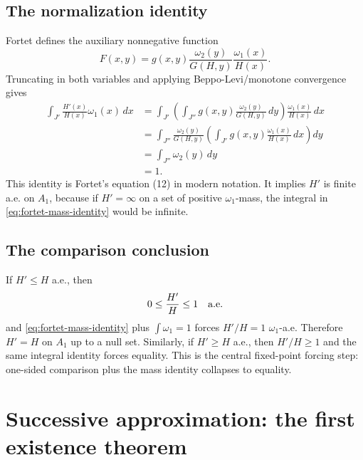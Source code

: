 \subsection{The normalization identity}
Fortet defines the auxiliary nonnegative function
\[
  F(x,y)=g(x,y)\frac{\omega_2(y)}{G(H,y)}\frac{\omega_1(x)}{H(x)}.
\]
Truncating in both variables and applying Beppo-Levi/monotone convergence gives
\begin{align*}
  \int_{J'} \frac{H'(x)}{H(x)}\omega_1(x)\,dx
  &= \int_{J'}\left(\int_{J''} g(x,y)\frac{\omega_2(y)}{G(H,y)}\,dy\right)
       \frac{\omega_1(x)}{H(x)}\,dx \\
  &= \int_{J''}\frac{\omega_2(y)}{G(H,y)}
       \left(\int_{J'}g(x,y)\frac{\omega_1(x)}{H(x)}\,dx\right)dy \\
  &= \int_{J''}\omega_2(y)\,dy \\
  &=1. \tag{M}\label{eq:fortet-mass-identity}
\end{align*}
This identity is Fortet's equation (12) in modern notation.  It implies $H'$ is finite a.e. on $A_1$, because if $H'=\infty$ on a set of positive $\omega_1$-mass, the integral in \eqref{eq:fortet-mass-identity} would be infinite.

\subsection{The comparison conclusion}
If $H'\le H$ a.e., then
\[
  0\le \frac{H'}{H}\le 1 \quad\hbox{a.e.}
\]
and \eqref{eq:fortet-mass-identity} plus $\int\omega_1=1$ forces $H'/H=1$ $\omega_1$-a.e.  Therefore $H'=H$ on $A_1$ up to a null set.
Similarly, if $H'\ge H$ a.e., then $H'/H\ge1$ and the same integral identity forces equality.
This is the central fixed-point forcing step: one-sided comparison plus the mass identity collapses to equality.

\section{Successive approximation: the first existence theorem}

